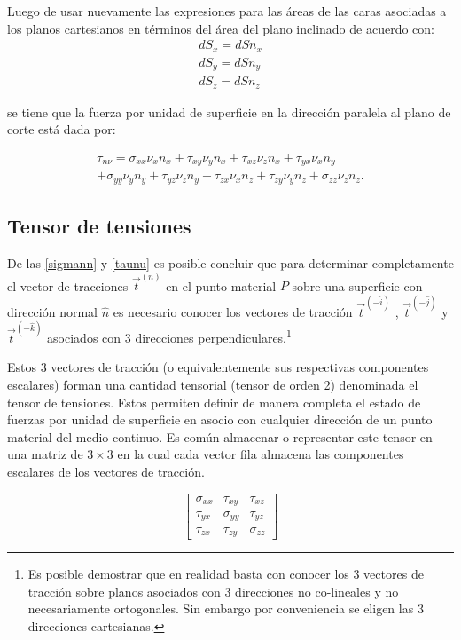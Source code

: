 \documentclass[../notas medios.tex]{subfiles}
\begin{document}
Luego de usar nuevamente las expresiones para las áreas de las caras asociadas a los planos cartesianos en términos del área del plano inclinado de acuerdo con:
\begin{align*}
d{S_x} = dS{n_x}\\
d{S_y} = dS{n_y}\\
d{S_z} = dS{n_z}
\end{align*}

se tiene que la fuerza por unidad de superficie en la dirección paralela al plano de corte está dada por:

\begin{equation}
\begin{aligned}
{\tau _{n\nu}} = {\sigma _{xx}}{\nu_x}{n_x} + {\tau _{xy}}{\nu_y}{n_x} + {\tau _{xz}}{\nu_z}{n_x} + {\tau _{yx}}{\nu_x}{n_y}\\
 + {\sigma _{yy}}{\nu_y}{n_y} + {\tau _{yz}}{\nu_z}{n_y} + {\tau _{zx}}{\nu_x}{n_z} + {\tau _{zy}}{\nu_y}{n_z} + {\sigma _{zz}}{\nu_z}{n_z}.
\end{aligned}
\label{taunu}
\end{equation}

\subsection{Tensor de tensiones}
De las \cref{sigmann} y \cref{taunu} es posible concluir que para determinar
completamente el vector de tracciones ${{\vec t}^{(n)}}$ en el punto material
$P$ sobre una superficie con dirección normal $\hat{n}$ es necesario conocer los
vectores de tracción ${{\vec t}^{( - \hat i)}}$ , ${{\vec t}^{( - \hat j)}}$ y
${{\vec t}^{( - \hat k)}}$ asociados con 3 direcciones 
perpendiculares.\footnote{Es posible demostrar que en realidad basta con conocer los 3 vectores de tracción sobre planos asociados con 3 direcciones no co-lineales y no necesariamente ortogonales. Sin embargo por conveniencia se eligen las 3 direcciones cartesianas.}

Estos 3 vectores de tracción (o equivalentemente sus respectivas componentes
escalares) forman una cantidad tensorial (tensor de orden 2) denominada el
tensor de tensiones. Estos permiten definir de manera completa el estado de fuerzas
por unidad de superficie en asocio con cualquier dirección de un punto material del medio
continuo. Es común almacenar o representar este tensor en una matriz de $3
\times 3$ en la cual cada vector fila almacena las componentes escalares de los vectores de tracción.

\[\left[ {\begin{array}{*{20}{c}}
{{\sigma _{xx}}}&{{\tau _{xy}}}&{{\tau _{xz}}}\\
{{\tau _{yx}}}&{{\sigma _{yy}}}&{{\tau _{yz}}}\\
{{\tau _{zx}}}&{{\tau _{zy}}}&{{\sigma _{zz}}}
\end{array}} \right]\]
\end{document}

